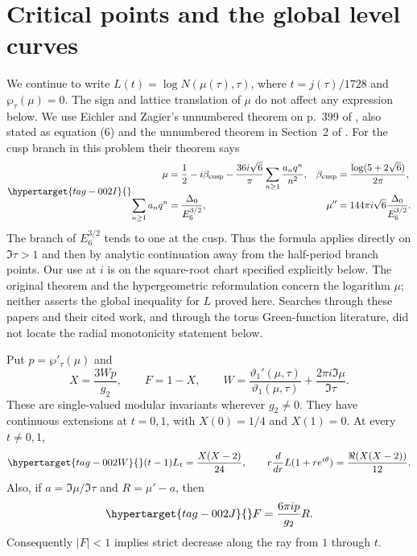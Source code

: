 \section{Critical points and the global level curves}

We continue to write $L(t)=\log N(\mu(\tau),\tau)$, where
$t=j(\tau)/1728$ and $\wp_\tau(\mu)=0$. The sign and lattice
translation of $\mu$ do not affect any expression below. We use
Eichler and Zagier's unnumbered theorem on p.~399 of
\cite{EichlerZagier1982}, also stated as equation (6) and the
unnumbered theorem in Section~2 of \cite{DukeImamoglu2008}.
For the cusp branch in this problem their theorem says
\begin{equation}\hypertarget{tag-002I}{}\label{ari:eq:cc-EZ}
 \begin{aligned}
 \mu&=\frac12-i\beta_{\rm cusp}-
       \frac{36i\sqrt6}{\pi}\sum_{n\ge1}\frac{a_nq^n}{n^2},
 &\beta_{\rm cusp}&=\frac{\log(5+2\sqrt6)}{2\pi},\\
 \sum_{n\ge1}a_nq^n&=\frac{\Delta_0}{E_6^{3/2}},
 &\mu''&=144\pi i\sqrt6\frac{\Delta_0}{E_6^{3/2}}.
 \end{aligned}
\end{equation}
The branch of $E_6^{3/2}$ tends to one at the cusp. Thus the
formula applies directly on $\Im\tau>1$ and then by analytic
continuation away from the half-period branch points. Our use at $i$ is on the square-root chart specified explicitly below.
The original theorem and the hypergeometric reformulation concern
the logarithm $\mu$; neither asserts the global inequality for
$L$ proved here. Searches through these papers and their cited
work, and through the torus Green-function literature, did not
locate the radial monotonicity statement below.

\begin{proposition}\hypertarget{tag-001M}{}\label{ari:C.8.12}

Put $p=\wp'_\tau(\mu)$ and
\[
 X=\frac{3Wp}{g_2},\qquad F=1-X,
 \qquad W=\frac{\vartheta_1'(\mu,\tau)}{\vartheta_1(\mu,\tau)}
              +\frac{2\pi i\Im\mu}{\Im\tau}.
\]
These are single-valued modular invariants wherever $g_2\ne0$.
They have continuous extensions at $t=0,1$, with
$X(0)=1/4$ and $X(1)=0$. At every $t\ne0,1$,
\begin{equation}\hypertarget{tag-002W}{}\label{ari:eq:cc-radial}
 (t-1)L_t=\frac{X(X-2)}{24},\qquad
 r\frac{d}{dr}L(1+re^{i\theta})
       =\frac{\Re(X(X-2))}{12}.
\end{equation}
Also, if $a=\Im\mu/\Im\tau$ and $R=\mu'-a$, then
\begin{equation}\hypertarget{tag-002J}{}\label{ari:eq:cc-FR}
 F=\frac{6\pi ip}{g_2}R.
\end{equation}
Consequently $|F|<1$ implies strict decrease along the ray
from $1$ through $t$.
\end{proposition}


